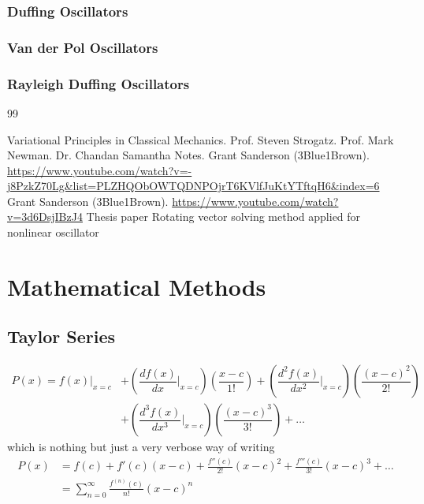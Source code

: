 \documentclass[10pt,twoside]{report}
\begin{document}
\subsection{Duffing Oscillators}

\subsection{Van der Pol Oscillators}

\subsection{Rayleigh Duffing Oscillators}


\newpage

\printglossary[title=Dictionary of Terms]


\newpage
\begin{thebibliography}{99} 

 Variational Principles in Classical Mechanics. \url{}
 Prof. Steven Strogatz.
 Prof. Mark Newman.
 Dr. Chandan Samantha Notes.
 Grant Sanderson (3Blue1Brown). \url{https://www.youtube.com/watch?v=-j8PzkZ70Lg&list=PLZHQObOWTQDNPOjrT6KVlfJuKtYTftqH6&index=6}
 Grant Sanderson (3Blue1Brown). \url{https://www.youtube.com/watch?v=3d6DsjIBzJ4}
 Thesis paper
\bibitem{}Rotating vector solving method applied for nonlinear
oscillator

\end{thebibliography}



\clearpage
\appendix
\chapter{Mathematical Methods}
\label{appendixA}
\section{Taylor Series}
 \begin{align*}
    P(x) = f(x)\bigg|_{x = c} &+ \left(\dfrac{df(x)}{dx}\bigg|_{x = c}\right) \left(\dfrac{x-c}{1!}\right) + \left(\dfrac{d^2f(x)}{dx^2}\bigg|_{x = c}\right)\left(\dfrac{(x-c)^2}{2!}\right) \\&+ \left(\dfrac{d^3f(x)}{dx^3}\bigg|_{x = c}\right)\left(\dfrac{(x-c)^3}{3!}\right) + \ldots
\end{align*}
which is nothing but just a very verbose way of writing 
\begin{align*}
    P(x) &= f(c) + f'(c)(x-c) + \frac{f''(c)}{2!}(x-c)^2 + \frac{f'''(c)}{3!}(x-c)^3 + \ldots \\
    &= \sum_{n=0}^{\infty} \frac{f^{(n)}(c)}{n!}(x-c)^n
\end{align*}
\end{document}

